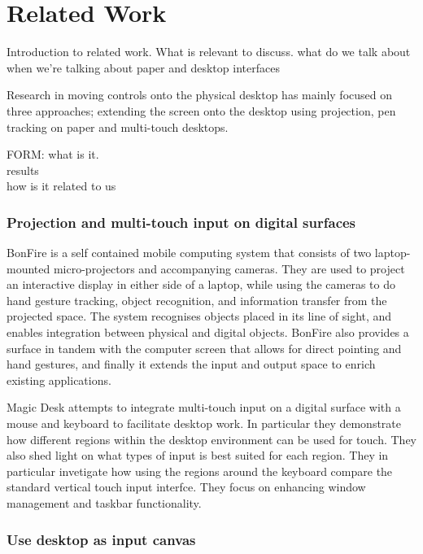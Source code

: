 \chapter{Related Work} %
\label{cha:related_work}
\nocite{*}
Introduction to related work. What is relevant to discuss. what do we talk about when we're talking about paper and desktop interfaces

Research in moving controls onto the physical desktop has mainly focused on three approaches; extending the screen onto the desktop using projection, pen tracking on paper and multi-touch desktops.



FORM:
what is it. \\
results \\
how is it related to us\\
\subsection{Projection and multi-touch input on digital surfaces} %
\label{sub:projection_and_multi_touch_input_on_digital_surfaces}

BonFire \cite{kane2009bonfire} is a self contained mobile computing system that consists of two laptop-mounted micro-projectors and accompanying cameras. They are used to project an interactive display in either side of a laptop, while using the cameras to do hand gesture tracking, object recognition, and information transfer from the projected space. The system recognises objects placed in its line of sight, and enables integration between physical and digital objects. BonFire also provides a surface in tandem with the computer screen that allows for direct pointing and hand gestures, and finally it extends the input and output space to enrich existing applications.


Magic Desk \cite{bi2011magic} attempts to integrate multi-touch input on a digital surface with a mouse and keyboard to facilitate desktop work. In particular they demonstrate how different regions within the desktop environment can be used for touch. They also shed light on what types of input is best suited for each region. They in particular invetigate how using the regions around the keyboard compare the standard vertical touch  input interfce. They focus on enhancing window management and taskbar functionality.

\subsection{Use desktop as input canvas} %
\label{sub:use_desktop_as_input_canvas}

